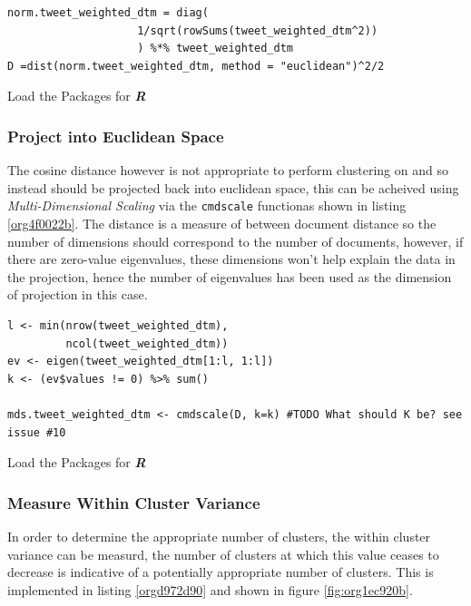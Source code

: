 \documentclass[11pt]{article}
\begin{document}
\begin{listing}[htbp]
\begin{verbatim}
norm.tweet_weighted_dtm = diag(
                    1/sqrt(rowSums(tweet_weighted_dtm^2))
                    ) %*% tweet_weighted_dtm
D =dist(norm.tweet_weighted_dtm, method = "euclidean")^2/2
\end{verbatim}
\caption{\label{org40b0040}Load the Packages for \textbf{\textbf{\emph{R}}}}
\end{listing}

\subsubsection{Project into Euclidean Space}
\label{sec:org6d45314}
The cosine distance however is not appropriate to perform clustering on and so instead should be projected back into euclidean space, this can be acheived using \emph{Multi-Dimensional Scaling} via the \texttt{cmdscale} functionas shown in listing \ref{org4f0022b}. The distance is a measure of between document distance so the number of dimensions should correspond to the number of documents, however, if there are zero-value eigenvalues, these dimensions won't help explain the data in the projection, hence the number of eigenvalues has been used as the dimension of projection in this case.

\begin{listing}[htbp]
\begin{verbatim}
l <- min(nrow(tweet_weighted_dtm),
         ncol(tweet_weighted_dtm))
ev <- eigen(tweet_weighted_dtm[1:l, 1:l])
k <- (ev$values != 0) %>% sum()

mds.tweet_weighted_dtm <- cmdscale(D, k=k) #TODO What should K be? see issue #10
\end{verbatim}
\caption{\label{org4f0022b}Load the Packages for \textbf{\textbf{\emph{R}}}}
\end{listing}

\subsubsection{Measure Within Cluster Variance}
\label{sec:orgcf99138}
In order to determine the appropriate number of clusters, the within cluster
variance can be measurd, the number of clusters at which this value ceases to
decrease is indicative of a potentially appropriate number of clusters. This is
implemented in listing \ref{orgd972d90} and shown in figure \ref{fig:org1ec920b}.
\end{document}
